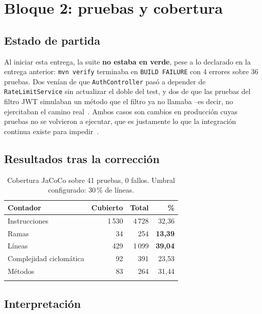 \documentclass[11pt,a4paper]{article}
\begin{document}
\section{Bloque 2: pruebas y cobertura}\label{sec:cobertura}

\subsection{Estado de partida}

Al iniciar esta entrega, la suite \textbf{no estaba en verde}, pese a lo declarado
en la entrega anterior: \texttt{mvn verify} terminaba en \texttt{BUILD FAILURE}
con 4 errores sobre 36 pruebas. Dos venían de que \texttt{AuthController} pasó a
depender de \texttt{RateLimitService} sin actualizar el doble del test, y dos de
que las pruebas del filtro JWT simulaban un método que el filtro ya no llamaba
--es decir, no ejercitaban el camino real~\cite{meszaros2007xunit}. Ambos casos
son cambios en producción cuyas pruebas no se volvieron a ejecutar, que es
justamente lo que la integración continua existe para impedir~\cite{humble2010continuous}.

\subsection{Resultados tras la corrección}

\begin{longtable}{@{}p{5.5cm}rrr@{}}
\toprule
\textbf{Contador} & \textbf{Cubierto} & \textbf{Total} & \textbf{\%} \\
\midrule
\endhead
Instrucciones & 1\,530 & 4\,728 & 32,36 \\
Ramas & 34 & 254 & \textbf{13,39} \\
Líneas & 429 & 1\,099 & \textbf{39,04} \\
Complejidad ciclomática & 92 & 391 & 23,53 \\
Métodos & 83 & 264 & 31,44 \\
\bottomrule
\caption{Cobertura JaCoCo sobre 41 pruebas, 0 fallos. Umbral configurado: 30\,\%
de líneas.}
\end{longtable}

\subsection{Interpretación}
\end{document}
